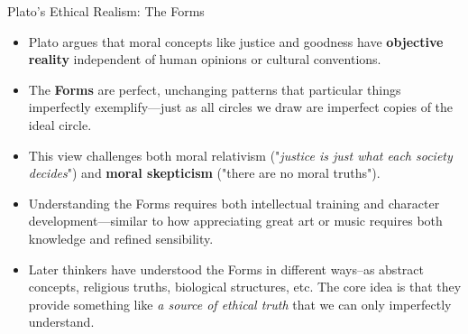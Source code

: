 \documentclass[aspectratio=169]{beamer}
\begin{document}
\begin{frame}{Plato's Ethical Realism: The Forms}
\begin{itemize}
\item Plato argues that moral concepts like justice and goodness have \textbf{objective reality} independent of human opinions or cultural conventions.
\item The \textbf{Forms} are perfect, unchanging patterns that particular things imperfectly exemplify—just as all circles we draw are imperfect copies of the ideal circle.
\item This view challenges both moral relativism ("\emph{justice is just what each society decides}") and \textbf{moral skepticism} ("there are no moral truths").
\item Understanding the Forms requires both intellectual training and character development—similar to how appreciating great art or music requires both knowledge and refined sensibility.
\item Later thinkers have understood the Forms in different ways--as abstract concepts, religious truths, biological structures, etc. The core idea is that they provide something like \emph{a source of ethical truth} that we can only imperfectly understand.
\end{itemize}
\end{frame}
\end{document}
